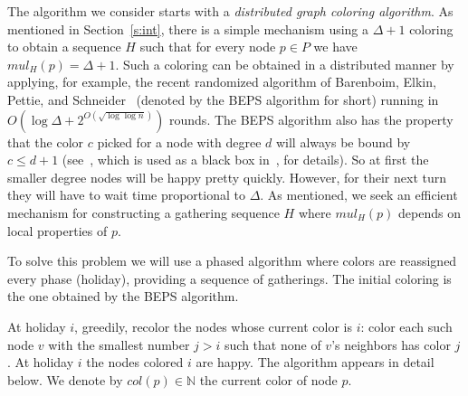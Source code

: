 \documentclass[11pt]{article}
\begin{document}
The algorithm we consider starts with a {\em distributed graph
coloring algorithm}. As mentioned in Section~\ref{s:int}, there is a simple mechanism using a $\Delta +1$ coloring to obtain a
sequence $H$ such that for every node $p\in P$ we have $mul_H(p) = \Delta +1$. Such a coloring can be obtained in a distributed manner by applying, for example, the recent randomized algorithm of Barenboim, Elkin, Pettie, and Schneider~\cite{BEPS12} (denoted by the BEPS algorithm for short) running in $O(\log \Delta + 2^{O(\sqrt{\log \log n})})$ rounds. The BEPS algorithm also has the property that the color $c$ picked for a node with degree $d$ will always be bound by $c\leq d+1$ (see~\cite{Johansson99}, which is used as a black box in~\cite{BEPS12}, for details). So at first the smaller degree nodes will be happy pretty quickly. However, for their next turn they will have to wait time proportional to $\Delta$.
As mentioned, we seek an efficient mechanism for constructing a gathering sequence $H$ where $mul_H(p)$ depends on local properties of $p$.



To solve this problem we will use a phased algorithm
where colors are reassigned every phase (holiday), providing a sequence of
gatherings. The initial coloring is the one obtained by the BEPS algorithm.

At holiday $i$, greedily,
recolor the nodes whose current color is $i$: color each such
node $v$ with the smallest number $j>i$ such that none of $v$'s neighbors
has color $j$. At holiday $i$ the nodes colored $i$ are happy. 
The algorithm appears in detail below. We denote by $col(p)\in
\mathbb{N}$ the current color of node $p$.

\end{document}
